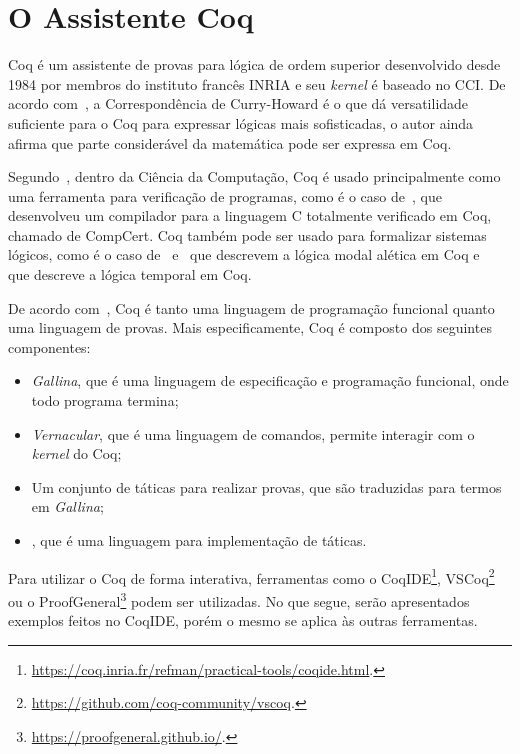 
	\section{O Assistente Coq}
		\label{sec:Coq}
		Coq é um assistente de provas para lógica de ordem superior desenvolvido desde 1984 por membros do instituto francês INRIA e seu \textit{kernel}
		é baseado no CCI. De acordo com~, a Correspondência de Curry-Howard é o que
		dá versatilidade suficiente para o Coq para expressar lógicas mais sofisticadas, o autor ainda afirma que parte considerável
		da matemática pode ser expressa em Coq.

		Segundo~, dentro da Ciência da Computação, Coq é usado principalmente como uma ferramenta para verificação de programas,
		como é o caso de~, que desenvolveu um compilador para a linguagem C totalmente verificado em Coq, chamado de CompCert.
		Coq também pode ser usado para formalizar sistemas lógicos, como é o caso de~ e~ que descrevem a lógica modal alética
		em Coq e ~ que descreve a lógica temporal em Coq.

		De acordo com~, Coq é tanto uma linguagem de programação funcional quanto uma linguagem de provas. Mais especificamente,
		Coq é composto dos seguintes componentes:
		\begin{itemize}
			\item \textit{Gallina}, que é uma linguagem de especificação e programação funcional, onde todo programa termina;
			\item \textit{Vernacular}, que é uma linguagem de comandos, permite interagir com o \textit{kernel} do Coq;
			\item Um conjunto de táticas para realizar provas, que são traduzidas para termos em \textit{Gallina};
			\item \Ltac, que é uma linguagem para implementação de táticas.
		\end{itemize}

		Para utilizar o Coq de forma interativa, ferramentas como o CoqIDE\footnote{\url{https://coq.inria.fr/refman/practical-tools/coqide.html}.},
		VSCoq\footnote{\url{https://github.com/coq-community/vscoq}.} ou o ProofGeneral\footnote{\url{https://proofgeneral.github.io/}.} podem ser utilizadas.
		No que segue, serão apresentados exemplos feitos no CoqIDE, porém o mesmo se aplica às outras ferramentas.

